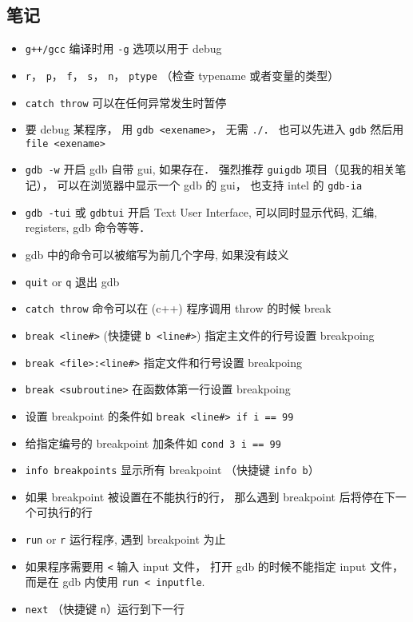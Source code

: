 

\subsection{笔记}
\begin{itemize}
\item \verb|g++/gcc| 编译时用 \verb`-g` 选项以用于 debug
\item \verb|r|， \verb|p|， \verb|f|， \verb|s|， \verb|n|， \verb|ptype| （检查 typename 或者变量的类型）
\item \verb|catch throw| 可以在任何异常发生时暂停
\item 要 debug 某程序， 用 \verb`gdb <exename>`， 无需 \verb`./`． 也可以先进入 \verb`gdb` 然后用 \verb`file <exename>`
\item \verb`gdb -w` 开启 gdb 自带 gui, 如果存在． 强烈推荐 \verb`guigdb` 项目（见我的相关笔记）， 可以在浏览器中显示一个 gdb 的 gui， 也支持 intel 的 \verb`gdb-ia`
\item \verb`gdb -tui` 或 \verb`gdbtui` 开启 Text User Interface, 可以同时显示代码, 汇编, registers, gdb 命令等等．
\item gdb 中的命令可以被缩写为前几个字母, 如果没有歧义
\item \verb`quit` or \verb`q` 退出 gdb
\item \verb`catch throw` 命令可以在 (c++) 程序调用 throw 的时候 break
\item \verb`break <line#>`  (快捷键 \verb`b <line#>`) 指定主文件的行号设置 breakpoing
\item \verb`break <file>:<line#>` 指定文件和行号设置 breakpoing
\item \verb`break <subroutine>` 在函数体第一行设置 breakpoing
\item 设置 breakpoint 的条件如 \verb`break <line#> if i == 99`
\item 给指定编号的 breakpoint 加条件如 \verb`cond 3 i == 99`
\item \verb`info breakpoints` 显示所有 breakpoint （快捷键 \verb`info b`）
\item 如果 breakpoint 被设置在不能执行的行， 那么遇到 breakpoint 后将停在下一个可执行的行
\item \verb`run` or \verb`r` 运行程序, 遇到 breakpoint 为止
\item 如果程序需要用 \verb`<` 输入 input 文件， 打开 gdb 的时候不能指定 input 文件， 而是在 gdb 内使用 \verb`run < inputfle`.
\item \verb`next` （快捷键 \verb`n`）运行到下一行 

\end{itemize}
